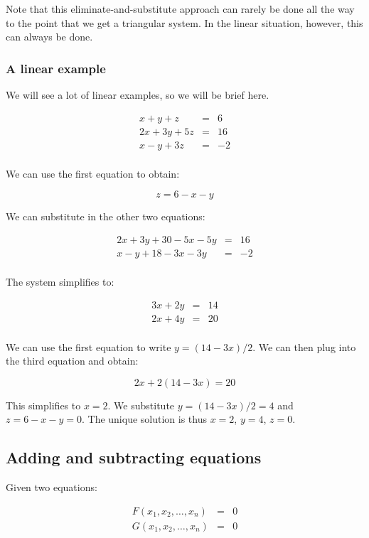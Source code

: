 \documentclass[10pt]{amsart}
\begin{document}
Note that this eliminate-and-substitute approach can rarely be done
all the way to the point that we get a triangular system. In the
linear situation, however, this can always be done.

\subsubsection{A linear example}

We will see a lot of linear examples, so we will be brief here.

\begin{eqnarray*}
  x + y + z & = & 6\\
  2x + 3y + 5z & = & 16\\
  x - y + 3z & = & -2\\
\end{eqnarray*}

We can use the first equation to obtain:

$$z = 6 - x - y$$

We can substitute in the other two equations:

\begin{eqnarray*}
  2x + 3y + 30 - 5x - 5y & = & 16 \\
  x - y + 18 - 3x - 3y & = & -2\\
\end{eqnarray*}

The system simplifies to:

\begin{eqnarray*}
  3x + 2y & = & 14\\
  2x + 4y & = & 20\\
\end{eqnarray*}

We can use the first equation to write $y = (14 - 3x)/2$. We can then
plug into the third equation and obtain:

$$2x + 2(14 - 3x) = 20$$

This simplifies to $x = 2$. We substitute $y = (14 - 3x)/2 = 4$ and $z
= 6 - x - y = 0$. The unique solution is thus $x = 2$, $y = 4$, $z =
0$.
\subsection{Adding and subtracting equations}

Given two equations:

\begin{eqnarray*}
  F(x_1,x_2,\dots,x_n) & = & 0\\
  G(x_1,x_2,\dots,x_n) & = & 0\\
\end{eqnarray*}
\end{document}
